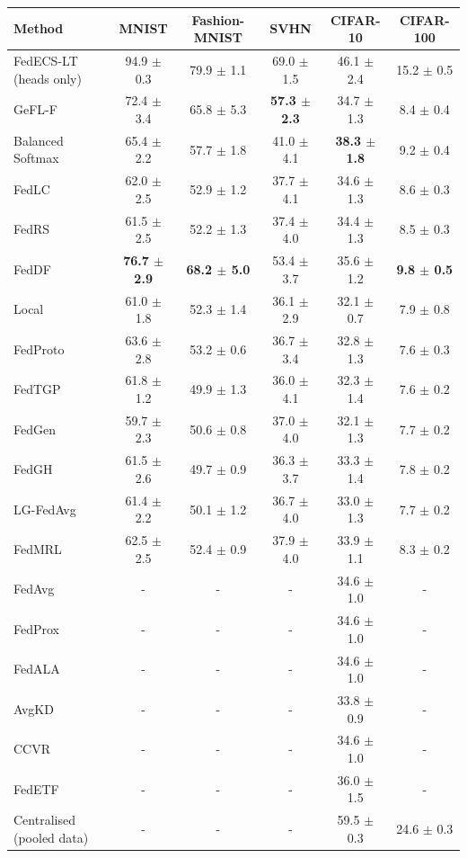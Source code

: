 \begin{tabular}{lccccc}
\toprule
Method & MNIST & Fashion-MNIST & SVHN & CIFAR-10 & CIFAR-100\\
\midrule
FedECS-LT (heads only) & 94.9 $\pm$ 0.3 & 79.9 $\pm$ 1.1 & 69.0 $\pm$ 1.5 & 46.1 $\pm$ 2.4 & 15.2 $\pm$ 0.5\\
GeFL-F & 72.4 $\pm$ 3.4 & 65.8 $\pm$ 5.3 & \textbf{57.3 $\pm$ 2.3} & 34.7 $\pm$ 1.3 & 8.4 $\pm$ 0.4\\
Balanced Softmax & 65.4 $\pm$ 2.2 & 57.7 $\pm$ 1.8 & 41.0 $\pm$ 4.1 & \textbf{38.3 $\pm$ 1.8} & 9.2 $\pm$ 0.4\\
FedLC & 62.0 $\pm$ 2.5 & 52.9 $\pm$ 1.2 & 37.7 $\pm$ 4.1 & 34.6 $\pm$ 1.3 & 8.6 $\pm$ 0.3\\
FedRS & 61.5 $\pm$ 2.5 & 52.2 $\pm$ 1.3 & 37.4 $\pm$ 4.0 & 34.4 $\pm$ 1.3 & 8.5 $\pm$ 0.3\\
FedDF & \textbf{76.7 $\pm$ 2.9} & \textbf{68.2 $\pm$ 5.0} & 53.4 $\pm$ 3.7 & 35.6 $\pm$ 1.2 & \textbf{9.8 $\pm$ 0.5}\\
Local & 61.0 $\pm$ 1.8 & 52.3 $\pm$ 1.4 & 36.1 $\pm$ 2.9 & 32.1 $\pm$ 0.7 & 7.9 $\pm$ 0.8\\
FedProto & 63.6 $\pm$ 2.8 & 53.2 $\pm$ 0.6 & 36.7 $\pm$ 3.4 & 32.8 $\pm$ 1.3 & 7.6 $\pm$ 0.3\\
FedTGP & 61.8 $\pm$ 1.2 & 49.9 $\pm$ 1.3 & 36.0 $\pm$ 4.1 & 32.3 $\pm$ 1.4 & 7.6 $\pm$ 0.2\\
FedGen & 59.7 $\pm$ 2.3 & 50.6 $\pm$ 0.8 & 37.0 $\pm$ 4.0 & 32.1 $\pm$ 1.3 & 7.7 $\pm$ 0.2\\
FedGH & 61.5 $\pm$ 2.6 & 49.7 $\pm$ 0.9 & 36.3 $\pm$ 3.7 & 33.3 $\pm$ 1.4 & 7.8 $\pm$ 0.2\\
LG-FedAvg & 61.4 $\pm$ 2.2 & 50.1 $\pm$ 1.2 & 36.7 $\pm$ 4.0 & 33.0 $\pm$ 1.3 & 7.7 $\pm$ 0.2\\
FedMRL & 62.5 $\pm$ 2.5 & 52.4 $\pm$ 0.9 & 37.9 $\pm$ 4.0 & 33.9 $\pm$ 1.1 & 8.3 $\pm$ 0.2\\
FedAvg & - & - & - & 34.6 $\pm$ 1.0 & -\\
FedProx & - & - & - & 34.6 $\pm$ 1.0 & -\\
FedALA & - & - & - & 34.6 $\pm$ 1.0 & -\\
AvgKD & - & - & - & 33.8 $\pm$ 0.9 & -\\
CCVR & - & - & - & 34.6 $\pm$ 1.0 & -\\
FedETF & - & - & - & 36.0 $\pm$ 1.5 & -\\
Centralised (pooled data) & - & - & - & 59.5 $\pm$ 0.3 & 24.6 $\pm$ 0.3\\
\bottomrule
\end{tabular}
